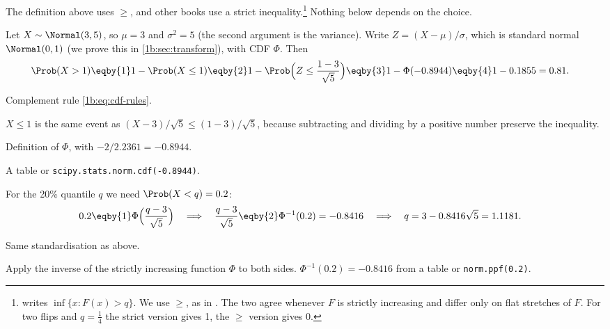 The definition above uses $\ge$, and other books use a strict inequality.\footnote{
writes $\inf\{x:F(x)>q\}$. We use $\ge$, as in
. The two agree whenever $F$ is strictly
increasing and differ only on flat stretches of $F$. For two flips and
$q=\tfrac14$ the strict version gives 1, the $\ge$ version gives 0.} Nothing below depends on the choice.

\label{1b:ex:normal-quantile}
Let $X\sim\Normal(3,5)$, so $\mu=3$ and $\sigma^2=5$ (the second argument is
the variance). Write $Z=(X-\mu)/\sigma$, which is standard normal $\Normal(0,1)$
(we prove this in \cref{1b:sec:transform}), with CDF $\Phi$. Then
\begin{align*}
  \Prob(X>1)
  &\eqby{1} 1-\Prob(X\le1)
   \eqby{2} 1-\Prob\Bigl(Z\le\frac{1-3}{\sqrt5}\Bigr)
   \eqby{3} 1-\Phi(-0.8944)
   \eqby{4} 1-0.1855 = 0.81 .
\end{align*}
\begin{explain}
  \item Complement rule \eqref{1b:eq:cdf-rules}.
  \item $X\le1$ is the same event as $(X-3)/\sqrt5\le(1-3)/\sqrt5$, because
        subtracting and dividing by a positive number preserve the inequality.
  \item Definition of $\Phi$, with $-2/2.2361=-0.8944$.
  \item A table or \texttt{scipy.stats.norm.cdf(-0.8944)}.
\end{explain}
For the 20\% quantile $q$ we need $\Prob(X<q)=0.2$:
\begin{align*}
  0.2
  &\eqby{1} \Phi\Bigl(\frac{q-3}{\sqrt5}\Bigr)
  \quad\Longrightarrow\quad
  \frac{q-3}{\sqrt5}\eqby{2}\Phi^{-1}(0.2)=-0.8416
  \quad\Longrightarrow\quad
  q = 3-0.8416\sqrt5 = 1.1181 .
\end{align*}
\begin{explain}
  \item Same standardisation as above.
  \item Apply the inverse of the strictly increasing function $\Phi$ to both
        sides. $\Phi^{-1}(0.2)=-0.8416$ from a table or
        \texttt{norm.ppf(0.2)}.
\end{explain}

